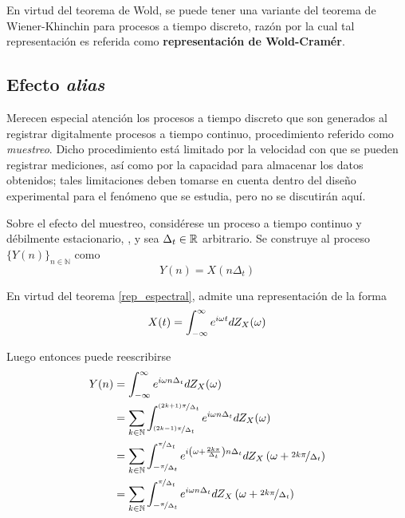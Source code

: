 En virtud del teorema de Wold, se puede tener una variante del teorema de Wiener-Khinchin
para procesos a tiempo discreto, razón por la cual  
tal representación es referida como \textbf{representación de Wold-Cramér}.


\subsection{Efecto \textit{alias}}

Merecen especial atención los procesos a tiempo discreto que son generados al registrar 
digitalmente procesos a tiempo continuo, procedimiento referido como \textit{muestreo}.
%
Dicho procedimiento está limitado por la velocidad con que se pueden registrar mediciones, así 
como por la capacidad para almacenar los datos obtenidos; tales limitaciones deben tomarse en 
cuenta dentro del diseño experimental para el fenómeno que se estudia, pero no se discutirán aquí.

Sobre el efecto del muestreo, considérese un proceso a tiempo continuo y débilmente estacionario, 
\xt, y sea $\Delta_t \in \mathbb{R}$ arbitrario.
%
Se construye al proceso $\{Y(n)\}_{n\in \mathbb{N}}$ como
\begin{equation}
Y(n) = X(n \Delta_t)
\end{equation}

En virtud del teorema \ref{rep_espectral}, \xt admite una representación de la forma
\begin{equation}
X(t) = \int_{-\infty}^{\infty} e^{i \omega t }  dZ_X(\omega)
\end{equation}

Luego entonces puede reescribirse
\begin{align}
Y(n) &= \int_{-\infty}^{\infty} e^{i \omega n \Delta_t} dZ_X(\omega) \nonumber \\
&= \sum_{k \in \mathbb{N}} \int_{\nicefrac{(2k-1)\pi}{\Delta_t}}^{\nicefrac{(2k+1)\pi}{\Delta_t}}
e^{i \omega n \Delta_t} dZ_X(\omega) \nonumber \\
&= \sum_{k \in \mathbb{N}} \int_{-\nicefrac{\pi}{\Delta_t}}^{\nicefrac{\pi}{\Delta_t}}
e^{i \left( \omega + \frac{2 k \pi}{\Delta_t} \right) n \Delta_t}
dZ_X\left( \omega + \nicefrac{2 k \pi}{\Delta_t}\right) \nonumber \\
&= \sum_{k \in \mathbb{N}} \int_{-\nicefrac{\pi}{\Delta_t}}^{\nicefrac{\pi}{\Delta_t}}
e^{i \omega n \Delta_t}
dZ_X\left( \omega + \nicefrac{2 k \pi}{\Delta_t}\right)
\end{align}

